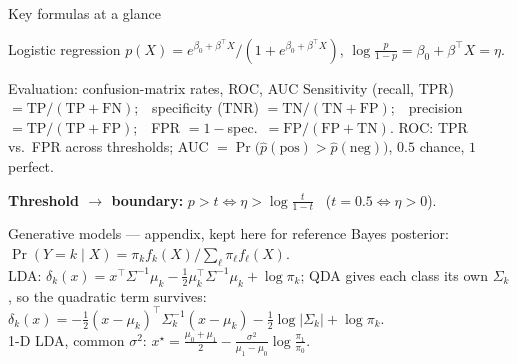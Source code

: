 \documentclass[aspectratio=169,11pt]{beamer}
\begin{document}
\begin{frame}{Key formulas at a glance}
  \footnotesize
  \begin{block}{Logistic regression}
    $p(X) = e^{\beta_0 + \beta^\top X}/(1 + e^{\beta_0 + \beta^\top X})$,
    \qquad
    $\log\frac{p}{1-p} = \beta_0 + \beta^\top X = \eta$.
  \end{block}
  \vspace{-2.6mm}
  \begin{block}{Evaluation: confusion-matrix rates, ROC, AUC}
    Sensitivity (recall, TPR) $=\mathrm{TP}/(\mathrm{TP+FN})$;\ \
    specificity (TNR) $=\mathrm{TN}/(\mathrm{TN+FP})$;\ \
    precision $=\mathrm{TP}/(\mathrm{TP+FP})$;\ \
    FPR $=1-$spec.\ $=\mathrm{FP}/(\mathrm{FP+TN})$.
    ROC: TPR vs.\ FPR across thresholds;
    AUC $=\Pr\bigl(\hat p(\text{pos})>\hat p(\text{neg})\bigr)$, $0.5$ chance, $1$ perfect.
  \end{block}
  \vspace{-2.6mm}
  \textbf{Threshold $\to$ boundary:}
  $p>t \iff \eta > \log\frac{t}{1-t}$ \ ($t=0.5\iff\eta>0$).
  \vspace{-0.5mm}
  \begin{block}{Generative models --- appendix, kept here for reference}
    Bayes posterior:
    $\Pr(Y = k \mid X) = \pi_k f_k(X) / \sum_\ell \pi_\ell f_\ell(X)$.
    \\[1pt]
    LDA: $\delta_k(x) = x^\top \Sigma^{-1}\mu_k - \tfrac12 \mu_k^\top \Sigma^{-1}\mu_k + \log\pi_k$;
    QDA gives each class its own $\Sigma_k$, so the quadratic term survives:
    $\delta_k(x) = -\tfrac12 (x-\mu_k)^\top \Sigma_k^{-1}(x-\mu_k)
      - \tfrac12\log|\Sigma_k| + \log\pi_k$.
    \\[1pt]
    1-D LDA, common $\sigma^2$:
    $x^\star = \frac{\mu_0+\mu_1}{2} - \frac{\sigma^2}{\mu_1-\mu_0}\log\frac{\pi_1}{\pi_0}$.
  \end{block}
\end{frame}
\end{document}

